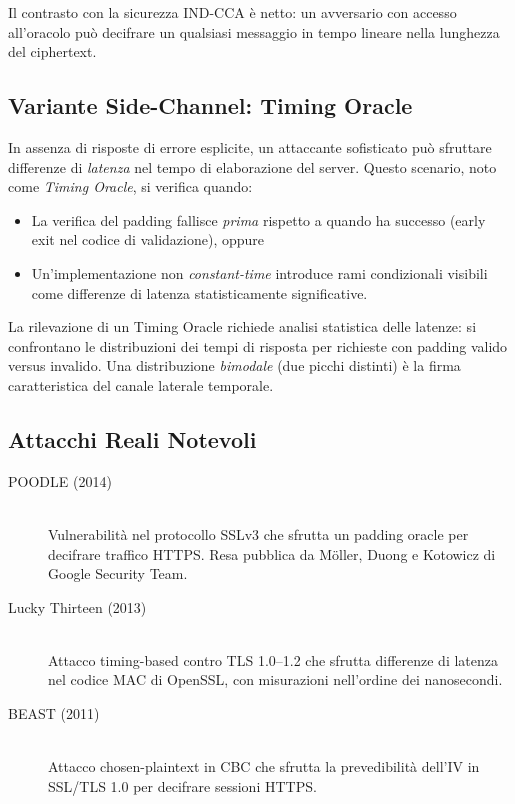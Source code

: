 \documentclass[12pt,a4paper]{article}
\begin{document}
Il contrasto con la sicurezza IND-CCA è netto: un avversario con accesso all'oracolo può
decifrare un qualsiasi messaggio in tempo lineare nella lunghezza del ciphertext.

\subsection{Variante Side-Channel: Timing Oracle}

In assenza di risposte di errore esplicite, un attaccante sofisticato può sfruttare
differenze di \emph{latenza} nel tempo di elaborazione del server. Questo scenario, noto
come \emph{Timing Oracle}, si verifica quando:

\begin{itemize}
  \item La verifica del padding fallisce \emph{prima} rispetto a quando ha successo
        (early exit nel codice di validazione), oppure
  \item Un'implementazione non \emph{constant-time} introduce rami condizionali visibili
        come differenze di latenza statisticamente significative.
\end{itemize}

La rilevazione di un Timing Oracle richiede analisi statistica delle latenze:
si confrontano le distribuzioni dei tempi di risposta per richieste con padding valido
versus invalido. Una distribuzione \emph{bimodale} (due picchi distinti) è la firma
caratteristica del canale laterale temporale.

\subsection{Attacchi Reali Notevoli}

\begin{description}
  \item[POODLE (2014)] \hfill \cite{poodle2014}\\
    Vulnerabilità nel protocollo SSLv3 che sfrutta un padding oracle per decifrare
    traffico HTTPS. Resa pubblica da Möller, Duong e Kotowicz di Google Security Team.
  \item[Lucky Thirteen (2013)] \hfill \cite{lucky13}\\
    Attacco timing-based contro TLS 1.0--1.2 che sfrutta differenze di latenza
    nel codice MAC di OpenSSL, con misurazioni nell'ordine dei nanosecondi.
  \item[BEAST (2011)] \hfill \cite{beast2011}\\
    Attacco chosen-plaintext in CBC che sfrutta la prevedibilità dell'IV in
    SSL/TLS 1.0 per decifrare sessioni HTTPS.
\end{description}
\end{document}
